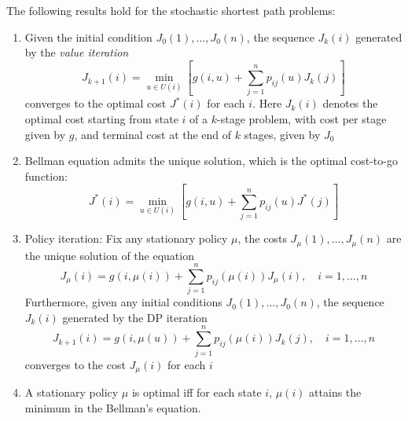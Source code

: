 \begin{proposition}\label{pro:6:1}
The following results hold for the stochastic shortest path problems:
\begin{enumerate}
\item
Given the initial condition $J_0(1),\dots,J_0(n)$, the sequence $J_k(i)$ generated by the \emph{value iteration}
\begin{equation}\label{Eq:6:1}
J_{k+1}(i)=\min_{u\in U(i)}\left[
g(i,u)+\sum_{j=1}^np_{ij}(u)J_k(j)
\right]
\end{equation}
converges to the optimal cost $J^*(i)$ for each $i$. Here $J_k(i)$ denotes the optimal cost starting from state $i$ of a $k$-stage problem, with cost per stage given by $g$, and terminal cost at the end of $k$ stages, given by $J_0$
\item
Bellman equation admits the unique solution, which is the optimal cost-to-go function:
\[
J^*(i) = \min_{u\in U(i)}\left[
g(i,u)+\sum_{j=1}^np_{ij}(u)J^*(j)
\right]
\]
\item
Policy iteration: Fix any stationary policy $\mu$, the costs $J_\mu(1),\dots,J_\mu(n)$ are the unique solution of the equation 
\[
J_\mu(i) = g(i,\mu(i))+\sum_{j=1}^np_{ij}(\mu(i))J_\mu(i),\quad
i=1,\dots,n
\]
Furthermore, given any initial conditions $J_0(1),\dots,J_0(n)$, the sequence $J_k(i)$ generated by the DP iteration
\[
J_{k+1}(i) = g(i,\mu(u))+\sum_{j=1}^np_{ij}(\mu(i))J_k(j),\quad
i=1,\dots,n
\]
converges to the cost $J_\mu(i)$ for each $i$
\item
A stationary policy $\mu$ is optimal iff for each state $i$, $\mu(i)$ attains the minimum in the Bellman's equation.
\end{enumerate}
\end{proposition}
